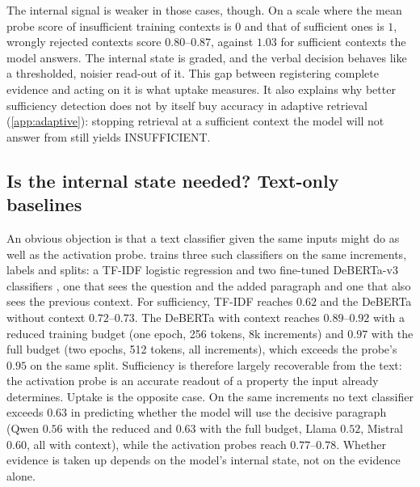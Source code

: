 The internal signal is weaker in those cases, though. On a scale where the mean probe score of insufficient training contexts is $0$ and that of sufficient ones is $1$, wrongly rejected contexts score $0.80$--$0.87$, against $1.03$ for sufficient contexts the model answers. The internal state is graded, and the verbal decision behaves like a thresholded, noisier read-out of it. This gap between registering complete evidence and acting on it is what uptake measures. It also explains why better sufficiency detection does not by itself buy accuracy in adaptive retrieval (\cref{app:adaptive}): stopping retrieval at a sufficient context the model will not answer from still yields INSUFFICIENT.

\subsection{Is the internal state needed? Text-only baselines}
\label{sec:text}
An obvious objection is that a text classifier given the same inputs might do as well as the activation probe.  trains three such classifiers on the same increments, labels and splits: a TF-IDF logistic regression and two fine-tuned DeBERTa-v3 classifiers \cite{he2023debertav3}, one that sees the question and the added paragraph and one that also sees the previous context. For sufficiency, TF-IDF reaches $0.62$ and the DeBERTa without context $0.72$--$0.73$. The DeBERTa with context reaches $0.89$--$0.92$ with a reduced training budget (one epoch, 256 tokens, 8k increments) and $0.97$ with the full budget (two epochs, 512 tokens, all increments), which exceeds the probe's $0.95$ on the same split. Sufficiency is therefore largely recoverable from the text: the activation probe is an accurate readout of a property the input already determines. Uptake is the opposite case. On the same increments no text classifier exceeds $0.63$ in predicting whether the model will use the decisive paragraph (Qwen $0.56$ with the reduced and $0.63$ with the full budget, Llama $0.52$, Mistral $0.60$, all with context), while the activation probes reach $0.77$--$0.78$. Whether evidence is taken up depends on the model's internal state, not on the evidence alone.

\begin{table}[t]
\centering\small
\setlength{\tabcolsep}{4pt}

\caption{Text-only classifiers trained on the same increments and splits as the activation probe (document split). ``q+added'': the classifier sees the question and the added paragraph; ``+context'': it also sees the previous context.}
\label{tab:text}
\end{table}
